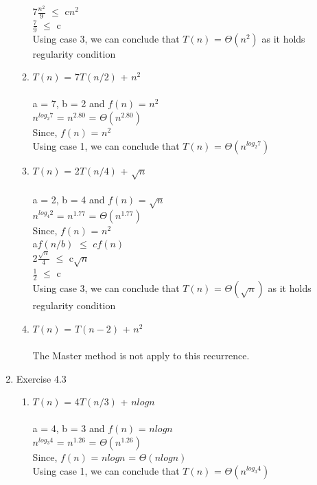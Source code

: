 \documentclass{article}
\begin{document}
\begin{enumerate}
\begin{enumerate}
        7$\frac{n^2}{9}$ $\leq$ c$n^2$\\
        $\frac{7}{9}$ $\leq$ c\\
        Using case 3, we can conclude that $T(n)$ = $\Theta(n^2)$ as it holds regularity condition\\
        \item $T(n)$ = 7$T(n/2)$ + $n^2$\\\\
        a = 7, b = 2 and $f(n)$ = $n^2$\\
        $n^{log_2^{}7}$ = $n^{2.80}$ = $\Theta(n^{2.80})$ \\
        Since, $f(n)$ = $n^2$\\
        Using case 1, we can conclude that $T(n)$ = $\Theta(n^{log_2^{}7})$\\
        \item $T(n)$ = 2$T(n/4)$ + $\sqrt{n}$ \\\\
        a = 2, b = 4 and $f(n)$ = $\sqrt{n}$\\
        $n^{log_4^{}2}$ = $n^{1.77}$ = $\Theta(n^{1.77})$ \\
        Since, $f(n)$ = $n^2$\\
        a$f(n/b)$ $\leq$ $cf(n)$\\
        2$\frac{\sqrt{n}}{4}$ $\leq$ c$\sqrt{n}$\\
        $\frac{1}{2}$ $\leq$ c\\
        Using case 3, we can conclude that $T(n)$ = $\Theta(\sqrt{n})$ as it holds regularity condition\\
        \item $T(n)$ = $T(n-2)$ + $n^2$\\\\
        The Master method is not apply to this recurrence.\\
    \end{enumerate}
    \item Exercise 4.3
    \begin{enumerate}
        \item $T(n)$ = 4$T(n/3)$ + $nlogn$\\\\
        a = 4, b = 3 and $f(n)$ = $nlogn$\\
        $n^{log_3^{}4}$ = $n^{1.26}$  = $\Theta(n^{1.26})$\\
        Since, $f(n)$ = $nlogn$ = $\Theta(nlogn)$\\
        Using case 1, we can conclude that $T(n)$ = $\Theta(n^{log_3^{}4})$\\

\end{enumerate}
\end{enumerate}
\end{document}
